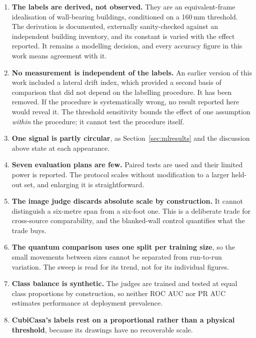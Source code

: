 \begin{enumerate}
\item \textbf{The labels are derived, not observed.} They are an
equivalent-frame idealisation of wall-bearing buildings, conditioned on a
160\,mm threshold. The derivation is documented, externally sanity-checked
against an independent building inventory, and its constant is varied with
the effect reported. It remains a modelling decision, and every accuracy
figure in this work means agreement with it.

\item \textbf{No measurement is independent of the labels.} An earlier
version of this work included a lateral drift index, which provided a
second basis of comparison that did not depend on the labelling procedure.
It has been removed. If the procedure is systematically wrong, no result
reported here would reveal it. The threshold sensitivity bounds the effect
of one assumption \emph{within} the procedure; it cannot test the
procedure itself.

\item \textbf{One signal is partly circular}, as
Section~\ref{sec:mlresults} and the discussion above state at each
appearance.

\item \textbf{Seven evaluation plans are few.} Paired tests are used and
their limited power is reported. The protocol scales without modification
to a larger held-out set, and enlarging it is straightforward.

\item \textbf{The image judge discards absolute scale by construction.} It
cannot distinguish a six-metre span from a six-foot one. This is a
deliberate trade for cross-source comparability, and the blanked-wall
control quantifies what the trade buys.

\item \textbf{The quantum comparison uses one split per training size},
so the small movements between sizes cannot be separated from run-to-run
variation. The sweep is read for its trend, not for its individual
figures.

\item \textbf{Class balance is synthetic.} The judges are trained and
tested at equal class proportions by construction, so neither ROC AUC nor
PR AUC estimates performance at deployment prevalence.

\item \textbf{CubiCasa's labels rest on a proportional rather than a
physical threshold}, because its drawings have no recoverable scale.


\end{enumerate}

